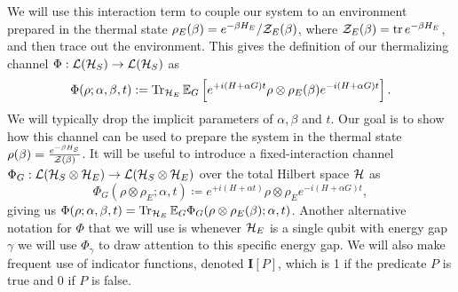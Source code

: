 We will use this interaction term to couple our system to an environment prepared in the thermal state $\rho_E(\beta) = e^{-\beta H_E} /\mathcal{Z}_E(\beta)$, where $\partfun_E(\beta) = \trace{e^{-\beta H_E}}$, and then trace out the environment. This gives the definition of our thermalizing channel $\Phi : \mathcal{L}(\mathcal{H}_S) \to \mathcal{L}(\mathcal{H}_S)$ as
\begin{equation}\label{eq:PhiDef}
    \Phi(\rho ; \alpha, \beta, t) :=  \Tr_{\mathcal{H}_E} \mathbb{E}_{G} \left[ e^{+i(H + \alpha G)t} \rho \otimes \rho_E(\beta) e^{-i(H + \alpha G) t}\right]. 
\end{equation}
We will typically drop the implicit parameters of $\alpha, \beta$ and $t$. Our goal is to show how this channel can be used to prepare the system in the thermal state $\rho(\beta) = \frac{e^{-\beta H_S}}{\mathcal{Z}(\beta)}$. It will be useful to introduce a fixed-interaction channel $\Phi_G : \mathcal{L}(\mathcal{H}_S \otimes \mathcal{H}_E) \to \mathcal{L}(\mathcal{H}_S \otimes \mathcal{H}_E)$ over the total Hilbert space $\mathcal{H}$ as 
\begin{equation}
    \Phi_G(\rho \otimes \rho_E; \alpha, t) \coloneqq e^{+i(H + \alpha t)} \rho \otimes \rho_E e^{- i(H + \alpha G)t}, \label{eq:phi_g_definition}
\end{equation}
giving us $\Phi(\rho; \alpha, \beta, t) = \Tr_{\mathcal{H}_E} \mathbb{E}_G \Phi_G(\rho \otimes \rho_E(\beta); \alpha, t)$. Another alternative notation for $\Phi$ that we will use is whenever $\mathcal{H}_E$ is a single qubit with energy gap $\gamma$ we will use $\Phi_\gamma$ to draw attention to this specific energy gap. We will also make frequent use of indicator functions, denoted $\mathbf{I}[P]$, which is 1 if the predicate $P$ is true and 0 if $P$ is false.

